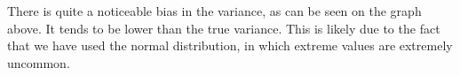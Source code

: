 There is quite a noticeable bias in the variance, as can be seen on the graph above. It tends to be lower than the true variance. This is likely due to the fact that we have used the normal distribution, in which extreme values are extremely uncommon.